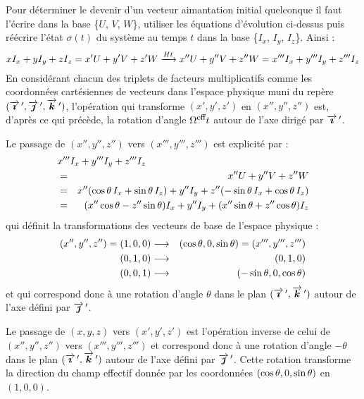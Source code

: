 Pour déterminer le devenir d'un vecteur aimantation initial quelconque
il faut l'écrire dans la base \{$U$, $V$, $W$\}, utiliser les équations
d'évolution ci-dessus puis réécrire l'état $\sigma(t)$
du système au temps $t$ dans la base \{$I_x$, $I_y$, $I_z$\}.
Ainsi :
\begin{equation}
xI_x + yI_y + zI_z = x'U + y'V +z'W \xrightarrow{Ht}
x''U + y''V + z''W = x'''I_x + y'''I_y + z'''I_z
\end{equation}
En considérant chacun des triplets de facteurs multiplicatifs comme les
coordonnées cartésiennes de vecteurs dans l'espace physique
muni du repère $(\overrightarrow{\boldsymbol{\imath}} \, ', \overrightarrow{\boldsymbol{\jmath}} \, ', \overrightarrow{\boldsymbol{k}} \, ')$, l'opération
qui transforme $(x',y',z')$ en $(x'',y'',z'')$ est, d'après ce qui précède,
la rotation d'angle $\Omega^{\mbox{\footnotesize{eff}}} t$ autour de l'axe dirigé par $\overrightarrow{\boldsymbol{\imath}} \, '$.

Le passage de $(x'',y'',z'')$ vers $(x''',y''',z''')$ est explicité par :
\begin{eqnarray}
\lefteqn{x'''I_x + y'''I_y + z'''I_z } \nonumber\\
& = & x''U + y''V + z''W  \\
& = & x''(\ct \, I_x + \st \, I_z) + y''I_y + z''(-\st \, I_x + \ct \, I_z) \\
& = & (x''\ct - z''\st)I_x + y''I_y + (x''\st + z''\ct) I_z
\end{eqnarray}
qui définit la transformations des vecteurs de base de l'espace physique :
\begin{eqnarray}
(x'',y'',z'') = (1,0,0) & \longrightarrow & (\cos\theta, 0, \sin\theta) = (x''', y''', z''') \\
(0,1,0) & \longrightarrow & (0, 1, 0) \\
(0,0,1) & \longrightarrow & (-\sin\theta, 0, \cos\theta)
\end{eqnarray}
et qui correspond donc à une rotation d'angle $\theta$ dans le plan $(\overrightarrow{\boldsymbol{\imath}} \, ', \overrightarrow{\boldsymbol{k}} \, ')$
autour de l'axe défini par $\overrightarrow{\boldsymbol{\jmath}} \, '$.

Le passage de $(x,y,z)$ vers $(x',y',z')$ est l'opération inverse de celui de
$(x'',y'',z'')$ vers $(x''',y''',z''')$ et correspond donc à
une rotation d'angle $-\theta$ dans le plan $(\overrightarrow{\boldsymbol{\imath}} \, ', \overrightarrow{\boldsymbol{k}} \, ')$
autour de l'axe défini par $\overrightarrow{\boldsymbol{\jmath}} \, '$.
Cette rotation transforme la direction du champ effectif donnée par les coordonnées
$(\cos\theta, 0, \sin\theta)$ en $(1,0,0)$.

